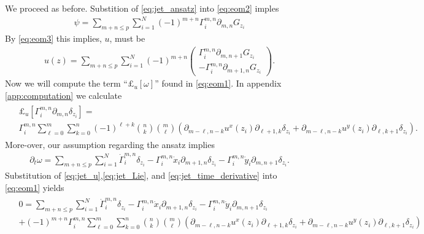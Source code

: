 \documentclass[12pt]{amsart}
\begin{document}
We proceed as before. Substition of \eqref{eq:jet_ansatz} into \eqref{eq:eom2} imples
\begin{align*}
  \psi = \sum_{m+n \leq p} \sum_{i=1}^N (-1)^{m+n}\Gamma_i^{m,n} \partial_{m,n} G_{z_i}
\end{align*}
By \eqref{eq:eom3} this implies, $u$, must be
\begin{align}
  u(z) = \sum_{m+n \leq p} \sum_{i=1}^N (-1)^{m+n}
  \begin{pmatrix}
    \Gamma_i^{m,n} \partial_{m,n+1} G_{z_i} \\
    -\Gamma_i^{m,n} \partial_{m+1,n} G_{z_i}
  \end{pmatrix}. \label{eq:jet_u}
\end{align}
Now we will compute the term ``$\pounds_u[\omega]$'' found in \eqref{eq:eom1}.
In appendix \ref{app:computation} we calculate
\begin{align}
  \begin{split}
  &\pounds_u[\Gamma_i^{m,n} \partial_{m,n} \delta_{z_i}] =\\
  &\Gamma_i^{m,n}
  \sum_{\ell=0}^m \sum_{k=0}^n
  (-1)^{\ell + k} \binom{n}{k} \binom{m}{\ell}
   \left(\partial_{m-\ell,n-k}u^x(z_i) \partial_{\ell+1,k} \delta_{z_i}
     +\partial_{m-\ell,n-k}u^y(z_i) \partial_{\ell,k+1} \delta_{z_i}
     \right)
   .
   \end{split}\label{eq:jet_Lie}
\end{align}
More-over, our assumption regarding the ansatz implies
\begin{align}
  \partial_t \omega = \sum_{m+n \leq p} \sum_{i=1}^N \dot{\Gamma}_i^{m,n} \delta_{z_i} - \Gamma_i^{m,n} \dot{x}_i \partial_{m+1,n} \delta_{z_i} - \Gamma_i^{m,n} \dot{y}_i \partial_{m,n+1} \delta_{z_i}. \label{eq:jet_time_derivative}
\end{align}
Substitution of \eqref{eq:jet_u},\eqref{eq:jet_Lie}, and \eqref{eq:jet_time_derivative} into \eqref{eq:eom1} yields
\begin{align}
  \begin{split}
    &0=\sum_{m+n \leq p} \sum_{i=1}^N \dot{\Gamma}_i^{m,n} \delta_{z_i} - \Gamma_i^{m,n} \dot{x}_i \partial_{m+1,n} \delta_{z_i} - \Gamma_i^{m,n} \dot{y}_i \partial_{m,n+1} \delta_{z_i} \\
   & +  (-1)^{m+n} \Gamma_i^{m,n} \sum_{\ell=0}^m \sum_{k=0}^n \binom{n}{k} \binom{m}{\ell}
   \left(\partial_{m-\ell,n-k}u^x(z_i) \partial_{\ell+1,k} \delta_{z_i}
     +\partial_{m-\ell,n-k}u^y(z_i) \partial_{\ell,k+1} \delta_{z_i}
     \right)
  \end{split}
  \label{eq:eom4}
\end{align}
\end{document}
